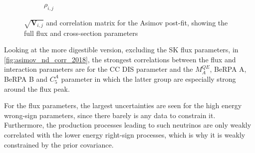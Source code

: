 \begin{figure}[h]
\begin{subfigure}[t]{0.49\textwidth}
		\caption{$\rho_{i,j}$}
	\end{subfigure}
	\caption{$\sqrt{\mathbf{V}_{i,j}}$ and correlation matrix for the Asimov post-fit, showing the full flux and cross-section parameters}
	\label{fig:asimov_full_corr_2018}
\end{figure}

Looking at the more digestible version, excluding the SK flux parameters, in \autoref{fig:asimov_nd_corr_2018}, the strongest correlations between the flux and interaction parameters are for the CC DIS parameter and the $M_A^{QE}$, BeRPA A, BeRPA B and $C_5^A$ parameter in which the latter group are especially strong around the flux peak.

For the flux parameters, the largest uncertainties are seen for the high energy wrong-sign \nue parameters, since there barely is any data to constrain it. Furthermore, the production processes leading to such neutrinos are only weakly correlated with the lower energy right-sign processes, which is why it is weakly constrained by the prior covariance.

